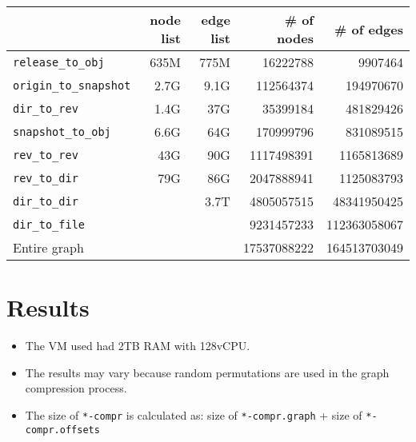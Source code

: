 \documentclass[11pt,a4paper]{article}
\begin{document}
\begin{center}
    \begin{tabular}{@{} l *4r @{}}
        \toprule
        \multicolumn{1}{c}{} &
            \textbf{node list} & \textbf{edge list} &
            \textbf{\# of nodes} & \textbf{\# of edges} \\
        \midrule
        \texttt{release\_to\_obj}
            & 635M & 775M & \num{16222788} & \num{9907464} \\
        \texttt{origin\_to\_snapshot}
            & 2.7G & 9.1G & \num{112564374} & \num{194970670} \\
        \texttt{dir\_to\_rev}
            & 1.4G & 37G & \num{35399184} & \num{481829426} \\
        \texttt{snapshot\_to\_obj}
            & 6.6G & 64G & \num{170999796} & \num{831089515} \\
        \texttt{rev\_to\_rev}
            & 43G & 90G & \num{1117498391} & \num{1165813689} \\
        \texttt{rev\_to\_dir}
            & 79G & 86G & \num{2047888941} & \num{1125083793} \\
        \texttt{dir\_to\_dir}
            & & 3.7T & \num{4805057515} & \num{48341950425} \\
        \texttt{dir\_to\_file}
            & & & \num{9231457233} & \num{112363058067} \\
        \midrule
        Entire graph & & & \num{17537088222} & \num{164513703049} \\
        \bottomrule
    \end{tabular}
\end{center}

\section{Results}

\begin{itemize}
    \item The VM used had 2TB RAM with 128vCPU.
    \item The results may vary because random permutations are used in the graph
        compression process.
    \item The size of \texttt{*-compr} is calculated as: size of
        \texttt{*-compr.graph} + size of
        \texttt{*-compr.offsets}
\end{itemize}
\end{document}
